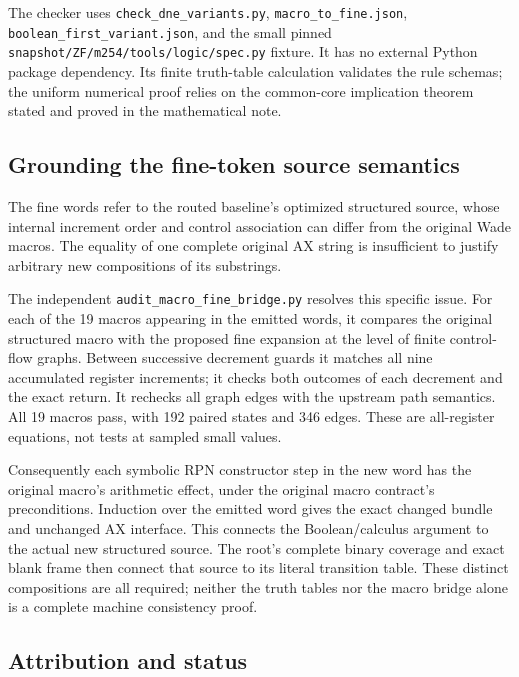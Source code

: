 The checker uses \texttt{check\_dne\_variants.py},
\texttt{macro\_to\_fine.json}, \nolinkurl{boolean_first_variant.json},
and the small pinned \nolinkurl{snapshot/ZF/m254/tools/logic/spec.py}
fixture. It has no external Python package dependency. Its finite
truth-table calculation validates the rule schemas; the uniform
numerical proof relies on the common-core implication theorem stated and
proved in the mathematical note.

\hypertarget{grounding-the-fine-token-source-semantics}{%
\subsection{Grounding the fine-token source
semantics}\label{grounding-the-fine-token-source-semantics}}

The fine words refer to the routed baseline's optimized structured
source, whose internal increment order and control association can
differ from the original Wade macros. The equality of one complete
original AX string is insufficient to justify arbitrary new compositions
of its substrings.

The independent \nolinkurl{audit_macro_fine_bridge.py} resolves this
specific issue. For each of the 19 macros appearing in the emitted
words, it compares the original structured macro with the proposed fine
expansion at the level of finite control-flow graphs. Between successive
decrement guards it matches all nine accumulated register increments; it
checks both outcomes of each decrement and the exact return. It rechecks
all graph edges with the upstream path semantics. All 19 macros pass,
with 192 paired states and 346 edges. These are all-register equations,
not tests at sampled small values.

Consequently each symbolic RPN constructor step in the new word has the
original macro's arithmetic effect, under the original macro contract's
preconditions. Induction over the emitted word gives the exact changed
bundle and unchanged AX interface. This connects the Boolean/calculus
argument to the actual new structured source. The root's complete binary
coverage and exact blank frame then connect that source to its literal
transition table. These distinct compositions are all required; neither
the truth tables nor the macro bridge alone is a complete machine
consistency proof.

\hypertarget{attribution-and-status}{%
\subsection{Attribution and status}\label{attribution-and-status}}

